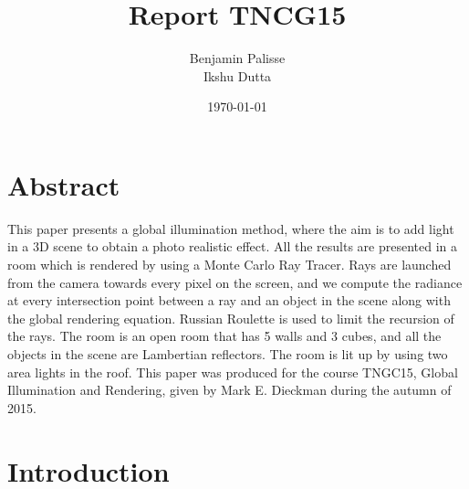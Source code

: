\documentclass[12pt]{article}
\title{{Report TNCG15 }\\}
\author{Benjamin Palisse \\ Ikshu Dutta}
\date{\today}
\numberwithin{equation}{section}
\begin{document}
\maketitle

\section{Abstract}
This paper presents a global illumination method, where the aim is to add light in a 3D scene to obtain a photo realistic effect. All the results are presented in a room which is rendered by using a Monte Carlo Ray Tracer. Rays are launched from the camera towards every pixel on the screen, and we compute the radiance at every intersection point between a ray and an object in the scene along with the global rendering equation. Russian Roulette is used to limit the recursion of the rays. The room is an open room that has 5 walls and 3 cubes, and all the objects in the scene are Lambertian reflectors. The room is lit up by using two area lights in the roof. This paper was produced for the course TNGC15, Global Illumination and Rendering, given by Mark E. Dieckman during the autumn of 2015.

\section{Introduction}
\end{document}
